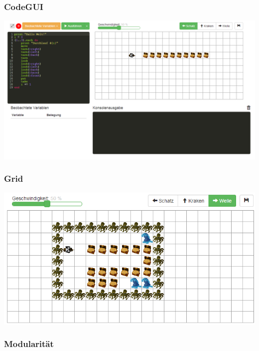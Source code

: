 \begin{frame}
\frametitle{CodeGUI}
\begin{center}
	\includegraphics[scale=0.35]{client/client}
\end{center}
\end{frame}

\begin{frame}
\frametitle{Grid}
\begin{center}
	\includegraphics[scale=0.35]{client/grid} %
\end{center}
\end{frame}

\begin{frame}
\frametitle{Modularität}
\begin{center}
	\inputminted[linenos, numbersep=2pt, tabsize=4]{javascript}{client/config.js}
\end{center}
\end{frame}
